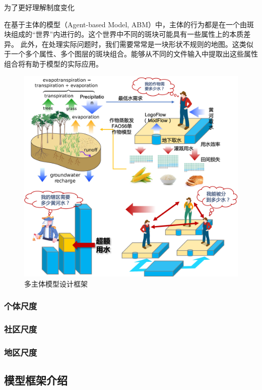 
为了更好理解制度变化

在基于主体的模型（Agent-based Model, ABM）中，主体的行为都是在一个由斑块组成的“世界”内进行的。这个世界中不同的斑块可能具有一些属性上的本质差异。
此外，在处理实际问题时，我们需要常常是一块形状不规则的地图。这类似于一个多个属性、多个图层的斑块组合。能够从不同的文件输入中提取出这些属性组合将有助于模型的实际应用。

\begin{figure}[htb]
    \centering
    \includegraphics[width=\textwidth]{img/ch6/ch6_framework.png}
    \caption{多主体模型设计框架}\label{ch6:fig:framework}
\end{figure}

\subsubsection*{个体尺度}

\subsubsection*{社区尺度}

\subsubsection*{地区尺度}

\subsection{模型框架介绍}

